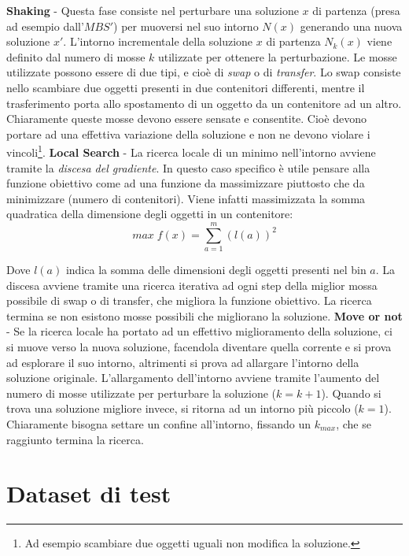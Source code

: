\documentclass{article}
\begin{document}
\textbf{Shaking} - Questa fase consiste nel perturbare una soluzione $x$ di partenza (presa ad esempio dall'$MBS'$) per muoversi nel suo intorno $N(x)$ generando una nuova soluzione $x'$. L'intorno incrementale della soluzione $x$ di partenza $N_{k}(x)$ viene definito dal numero di mosse $k$ utilizzate per ottenere la perturbazione. 
\newline
\newline
Le mosse utilizzate possono essere di due tipi, e cioè di \textit{swap} o di \textit{transfer}. Lo swap consiste nello scambiare due oggetti presenti in due contenitori differenti, mentre il trasferimento porta allo spostamento di un oggetto da un contenitore ad un altro. Chiaramente queste mosse devono essere sensate e consentite. Cioè devono portare ad una effettiva variazione della soluzione e non ne devono violare i vincoli\footnote{Ad esempio scambiare due oggetti uguali non modifica la soluzione.}. 
\newline
\newline
\textbf{Local Search} - La ricerca locale di un minimo nell'intorno avviene tramite la \textit{discesa del gradiente}. In questo caso specifico è utile pensare alla funzione obiettivo come ad una funzione da massimizzare piuttosto che da minimizzare (numero di contenitori). Viene infatti massimizzata la somma quadratica della dimensione degli oggetti in un contenitore:
\[
max\;f(x) = \sum_{a=1}^{m} (l(a))^2
\]

Dove $l(a)$ indica la somma delle dimensioni degli oggetti presenti nel bin $a$.
La discesa avviene tramite una ricerca iterativa ad ogni step della miglior mossa possibile di swap o di transfer, che migliora la funzione obiettivo. La ricerca termina se non esistono mosse possibili che migliorano la soluzione.
\newline
\newline
\textbf{Move or not} - Se la ricerca locale ha portato ad un effettivo miglioramento della soluzione, ci si muove verso la nuova soluzione, facendola diventare quella corrente e si prova ad esplorare il suo intorno, altrimenti si prova ad allargare l'intorno della soluzione originale. L'allargamento dell'intorno avviene tramite l'aumento del numero di mosse utilizzate per perturbare la soluzione ($k=k+1$). Quando si trova una soluzione migliore invece, si ritorna ad un intorno più piccolo ($k=1$). Chiaramente bisogna settare un confine all'intorno, fissando un $k_{max}$, che se raggiunto termina la ricerca.

\section{Dataset di test}
\end{document}
